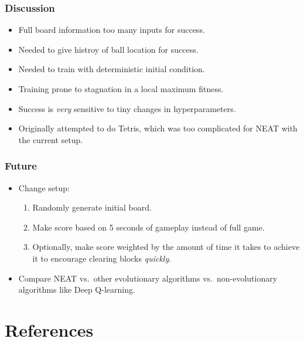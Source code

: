 \documentclass[t,pdflatex]{beamer}
\begin{document}
        \begin{frame}

        \frametitle{Discussion}
         \begin{itemize}
             \item Full board information too many inputs for success.
             \item Needed to give histroy of ball location for success.
             \item Needed to train with deterministic initial condition.
             \item Training prone to stagnation in a local maximum fitness.
             \item Success is \emph{very} sensitive to tiny changes in hyperparameters.
             \item Originally attempted to do Tetris, which was too complicated for NEAT with the current setup.
         \end{itemize}

    \end{frame}

        \begin{frame}

        \frametitle{Future}
        \begin{itemize}
            \item Change setup:
                \begin{enumerate}
                    \item Randomly generate initial board.
                    \item Make score based on 5 seconds of gameplay instead of full game.
                    \item Optionally, make score weighted by the amount of time it takes to achieve it to encourage clearing blocks \emph{quickly}.
                \end{enumerate}
            \item Compare NEAT vs.\ other evolutionary algorithms vs.\ non-evolutionary algorithms like Deep Q-learning.
        \end{itemize}


    \end{frame}

    \section{References}
\end{document}
